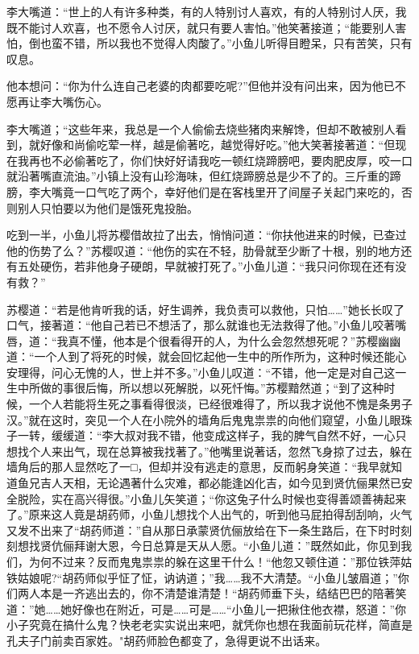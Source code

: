 \documentclass[12pt,oneside]{book}
\begin{document}
李大嘴道：``世上的人有许多种类，有的人特别讨人喜欢，有的人特别讨人厌，我既不能讨人欢喜，也不愿令人讨厌，就只有要人害怕。''他笑著接道；``能要别人害怕，倒也蛮不错，所以我也不觉得人肉酸了。''小鱼儿听得目瞪呆，只有苦笑，只有叹息。

他本想问：``你为什么连自己老婆的肉都要吃呢?''但他并没有问出来，因为他已不愿再让李大嘴伤心。

李大嘴道；``这些年来，我总是一个人偷偷去烧些猪肉来解馋，但却不敢被别人看到，就好像和尚偷吃荤一样，越是偷著吃，越觉得好吃。''他大笑著接著道：``但现在我再也不必偷著吃了，你们快好好请我吃一顿红烧蹄膀吧，要肉肥皮厚，咬一口就沿著嘴直流油。''小镇上没有山珍海味，但红烧蹄膀总是少不了的。三斤重的蹄膀，李大嘴竟一口气吃了两个，幸好他们是在客栈里开了间屋子关起门来吃的，否则别人只怕要以为他们是饿死鬼投胎。

吃到一半，小鱼儿将苏樱借故拉了出去，悄悄问道：``你扶他进来的时候，已查过他的伤势了么？''苏樱叹道：``他伤的实在不轻，肋骨就至少断了十根，别的地方还有五处硬伤，若非他身子硬朗，早就被打死了。''小鱼儿道：``我只问你现在还有没有救？''

苏樱道：``若是他肯听我的话，好生调养，我负责可以救他，只怕\ldots\ldots{}''她长长叹了口气，接著道：``他自己若已不想活了，那么就谁也无法救得了他。''小鱼儿咬著嘴唇，道：``我真不懂，他本是个很看得开的人，为什么会忽然想死呢？''苏樱幽幽道：``一个人到了将死的时候，就会回忆起他一生中的所作所为，这种时候还能心安理得，问心无愧的人，世上并不多。''小鱼儿叹道：``不错，他一定是对自己这一生中所做的事很后悔，所以想以死解脱，以死忏悔。''苏樱黯然道；``到了这种时候，一个人若能将生死之事看得很淡，已经很难得了，所以我才说他不愧是条男子汉。''就在这时，突见一个人在小院外的墙角后鬼鬼祟祟的向他们窥望，小鱼儿眼珠子一转，缓缓道：``李大叔对我不错，他变成这样子，我的脾气自然不好，一心只想找个人来出气，现在总算被我找著了。''他嘴里说著话，忽然飞身掠了过去，躲在墙角后的那人显然吃了一□，但却并没有逃走的意思，反而躬身笑道：``我早就知道鱼兄吉人天相，无论遇著什么灾难，都必能逢凶化吉，如今见到贤伉俪果然已安全脱险，实在高兴得很。''小鱼儿矢笑道；``你这兔子什么时候也变得善颂善祷起来了。''原来这人竟是胡药师，小鱼儿想找个人出气的，听到他马屁拍得刮刮响，火气又发不出来了``胡药师道：''自从那日承蒙贤伉俪放给在下一条生路后，在下时时刻刻想找贤伉俪拜谢大恩，今日总算是天从人愿。``小鱼儿道：''既然如此，你见到我们，为何不过来？反而鬼鬼祟祟的躲在这里干什么！``他忽又顿住道：''那位铁萍姑铁姑娘呢?``胡药师似乎怔了怔，讷讷道；''我\ldots\ldots 我不大清楚。``小鱼儿皱眉道；''你们两人本是一齐逃出去的，你不清楚谁清楚！``胡药师垂下头，结结巴巴的陪著笑道：''她\ldots\ldots 她好像也在附近，可是\ldots\ldots 可是\ldots\ldots{}``小鱼儿一把揪住他衣襟，怒道：''你小子究竟在搞什么鬼？快老老实实说出来吧，就凭你也想在我面前玩花样，简直是孔夫子门前卖百家姓。"胡药师脸色都变了，急得更说不出话来。
\end{document}
